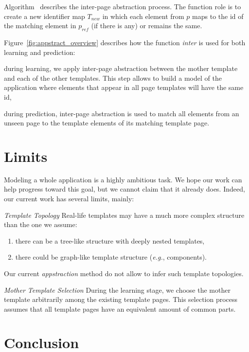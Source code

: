 \documentclass[sigconf,authordraft]{acmart}
\theoremstyle{definition}
\begin{document}
Algorithm~\label{alg:inter-page} describes the inter-page abstraction process.
The function role is to create a new identifier map $T_{new}$ in which each element from $p$ maps to the id of the matching element in $p_{ref}$ (if there is any) or remains the same.

Figure~\ref{fig:appstract_overview} describes how the function \emph{inter} is used for both learning and prediction:
\begin{compactenum}
    \item during learning, we apply inter-page abstraction between the mother template and each of the other templates. This step allows to build a model of the application where elements that appear in all page templates will have the same id,
    \item during prediction, inter-page abstraction is used to match all elements from an unseen page to the template elements of its matching template page.
\end{compactenum}


\section{Limits}
Modeling a whole application is a highly ambitious task.
We hope our work can help progress toward this goal, but we cannot claim that it already does.
Indeed, our current work has several limits, mainly:

\emph{Template Topology}
Real-life templates may have a much more complex structure than the one we assume:
\begin{enumerate}
\item there can be a tree-like structure with deeply nested templates,
\item there could be graph-like template structure (\emph{e.g.}, components).
\end{enumerate}
Our current \emph{appstraction} method do not allow to infer such template topologies.

\emph{Mother Template Selection}
During the learning stage, we choose the mother template arbitrarily among the existing template pages.
This selection process assumes that all template pages have an equivalent amount of common parts.

\section{Conclusion}\label{sec:conclusion}





\end{document}

